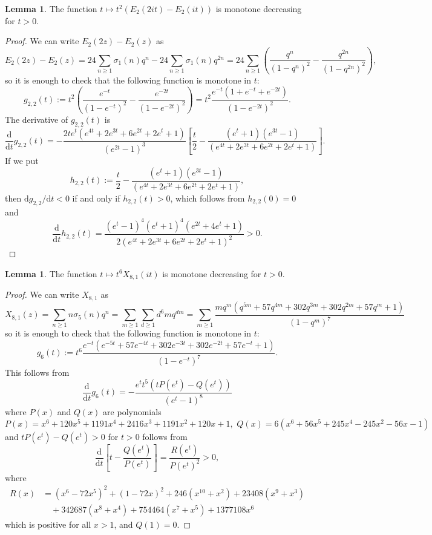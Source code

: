 \documentclass[10pt,reqno]{amsproc}
\newcommand{\dd}{\mathrm{d}}
\newcommand{\1}{\mathds{1}}	%
\theoremstyle{definition}
\newtheorem{lemma}[theorem]{Lemma}
\theoremstyle{remark}
\begin{document}
\begin{lemma}
    \label{lem:polymod_D2}
    The function $t \mapsto t^2 (E_2(2it) - E_2(it))$ is monotone decreasing for $t > 0$.
\end{lemma}
\begin{proof}
    We can write $E_2(2z) - E_2(z)$ as
    \begin{equation*}
        E_2(2z) - E_2(z) = 24 \sum_{n \ge 1} \sigma_1(n) q^n - 24 \sum_{n \ge 1} \sigma_1(n) q^{2n} = 24\sum_{n \ge 1} \left(\frac{q^n}{(1 - q^n)^2} - \frac{q^{2n}}{(1 - q^{2n})^2}\right),
    \end{equation*}
    so it is enough to check that the following function is monotone in $t$:
    \[
        g_{2,2}(t) := t^2 \left(\frac{e^{-t}}{(1 - e^{-t})^2} - \frac{e^{-2t}}{(1 - e^{-2t})^2}\right) = t^2 \frac{e^{-t}(1 + e^{-t} + e^{-2t})}{(1 - e^{-2t})^2}.
    \]
    The derivative of $g_{2,2}(t)$ is
    \[
    \frac{\dd}{\dd t} g_{2, 2}(t) = - \frac{2t e^t (e^{4t} + 2e^{3t} + 6e^{2t} + 2e^t + 1)}{(e^{2t} - 1)^3} \left[\frac{t}{2} - \frac{(e^t + 1)(e^{3t} - 1)}{(e^{4t} + 2e^{3t} + 6e^{2t} + 2e^{t} + 1)}\right].
    \]
    If we put
    \[
    h_{2,2}(t) := \frac{t}{2} - \frac{(e^t + 1)(e^{3t} - 1)}{(e^{4t} + 2e^{3t} + 6e^{2t} + 2e^{t} + 1)},
    \]
    then $\dd g_{2,2} / \dd t < 0$ if and only if $h_{2,2}(t) > 0$, which follows from $h_{2,2}(0) = 0$ and
    \[
    \frac{\dd}{\dd t} h_{2,2}(t) = \frac{(e^t - 1)^4 (e^t + 1)^4 (e^{2t} + 4e^{t} + 1)}{2(e^{4t} + 2e^{3t} + 6e^{2t} + 2e^{t} + 1)^2} > 0.
    \]
\end{proof}

\begin{lemma}
    \label{lem:X81weak}
    The function $t \mapsto t^{6} X_{8, 1}(it)$ is monotone decreasing for $t > 0$.
\end{lemma}
\begin{proof}
    We can write $X_{8, 1}$ as
    \[
        X_{8, 1}(z) = \sum_{n \ge 1} n \sigma_5(n) q^n = \sum_{m \ge 1} \sum_{d \ge 1} d^6 m q^{dm} = \sum_{m \ge 1} \frac{m q^m (q^{5m} + 57 q^{4m} + 302 q^{3m} + 302 q^{2m} + 57 q^m + 1)}{(1 - q^m)^7}
    \]
    so it is enough to check that the following function is monotone in $t$:
    \[
    g_6(t) := t^6 \frac{e^{-t} (e^{-5t} + 57 e^{-4t} + 302 e^{-3t} + 302 e^{-2t} + 57 e^{-t} + 1)}{(1 - e^{-t})^7}.
    \]
    This follows from
    \[
    \frac{\dd}{\dd t} g_6(t) = -\frac{e^t t^5 (t P(e^t) - Q(e^t))}{(e^t - 1)^8}
    \]
    where $P(x)$ and $Q(x)$ are polynomials
    \[
    P(x) = x^6 + 120 x^5 + 1191 x^4 + 2416 x^3 + 1191 x^2 + 120 x + 1,\,\, Q(x) = 6 (x^6 + 56 x^5 + 245 x^4 - 245 x^2 - 56 x - 1)
    \]
    and $t P(e^t) - Q(e^t) > 0$ for $t > 0$ follows from
    \[
    \frac{\dd}{\dd t} \left[t - \frac{Q(e^t)}{P(e^t)}\right] = \frac{R(e^t)}{P(e^t)^2} > 0,
    \]
    where
    \begin{align*}
    R(x) &= (x^6 - 72 x^5)^2 + (1 - 72 x)^2 + 246 (x^{10} + x^2) + 23408 (x^9 + x^3) \\
    &\quad + 342687 (x^8 + x^4) + 754464 (x^7 + x^5) + 1377108 x^6
    \end{align*}
    which is positive for all $x > 1$, and $Q(1) = 0$.
\end{proof}
\end{document}

